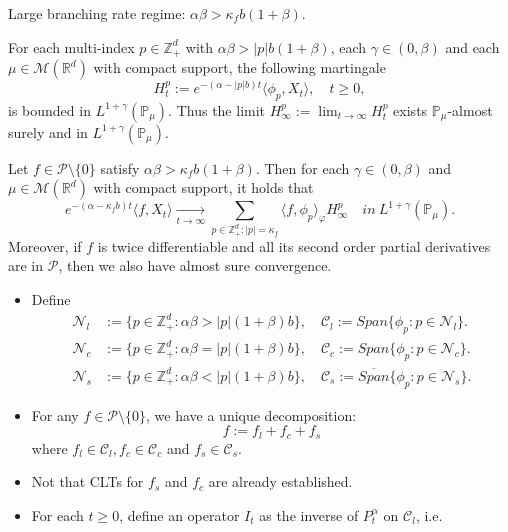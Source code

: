 \documentclass[9pt]{beamer}
\begin{document}
\begin{frame}[allowframebreaks]{Large branching rate regime: $\alpha\beta > \kappa_f b (1+\beta)$.}
\begin{lemma}
	For each multi-index $p\in \mathbb Z_+^d$ with $\alpha \beta > |p|b(1+\beta)$, each $\gamma \in (0,\beta)$ and each $\mu \in \mathcal M(\mathbb R^d)$ with compact support, the following martingale
\[
	H_t^p:= e^{-(\alpha-|p|b) t} \langle \phi_p, X_t\rangle, \quad t\geq 0,
\]
	is bounded in $L^{1+\gamma}(\mathbb P_\mu)$. 
	Thus the limit $H_\infty^p:= \lim_{t\to \infty} H_t^p$ exists $\mathbb P_\mu$-almost surely and in $L^{1+\gamma}(\mathbb P_\mu)$.
\end{lemma}
\begin{theorem}
	Let $f \in \mathcal{P}\setminus\{0\}$ satisfy $\alpha\beta>\kappa_fb(1+\beta)$. 
	Then for each $\gamma\in (0, \beta)$ and $\mu\in \mathcal M(\mathbb R^d)$ with compact support, it holds that
\[
    e^{-(\alpha-\kappa_fb)t}\langle f, X_t\rangle
       \xrightarrow[t\to \infty]{}\sum_{p\in \mathbb Z_+^d:|p|=\kappa_f}\langle f, \phi_p\rangle_{\varphi} H_{\infty}^p
    \quad in~ L^{1+\gamma}(\mathbb{P}_{\mu}).
\]
    Moreover, if $f$ is twice differentiable and all its second order partial derivatives are in $\mathcal{P}$, then we also have almost sure convergence.
\end{theorem}
\begin{itemize}
\item
	Define
\begin{align}
	\mathcal{N}_l
	&:=\{p\in \mathbb{Z}_+^d:  \alpha\beta>|p|(1+\beta)b\},
	\quad \mathcal{C}_l
	:=Span\{\phi_p:p\in\mathcal N_l\}.
	\\\mathcal{N}_c
	&:=\{p\in \mathbb{Z}_+^d:  \alpha\beta=|p|(1+\beta)b\},
	\quad \mathcal{C}_c
	:=Span\{\phi_p:p\in\mathcal N_c\}.
	\\\mathcal{N}_s
	&:=\{p\in \mathbb{Z}_+^d:  \alpha\beta<|p|(1+\beta)b\},
	\quad \mathcal{C}_s
	:=\overline{Span}\{\phi_p:p\in\mathcal N_s\}.
\end{align}
\item
	For any $f\in \mathcal P\setminus\{0\}$, we have a unique decomposition: 
\[
	f := f_l + f_c + f_s
\]
	where $f_l \in \mathcal C_l, f_c\in \mathcal C_c$ and $f_s\in \mathcal C_s$.
\item
	Not that CLTs for $f_s$ and $f_c$ are already established.
\item
	For each $t\ge 0$, define an operator $I_t$ as the inverse of $P_t^\alpha$ on $\mathcal{C}_l$, i.e.

\end{itemize}
\end{frame}
\end{document}
